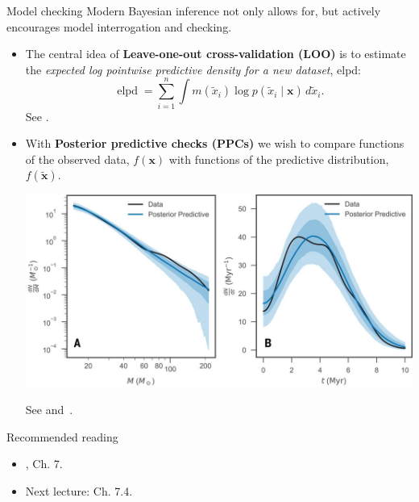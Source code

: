 \begin{frame}{Model checking}
Modern Bayesian inference not only allows for, but actively encourages model interrogation and checking.
\begin{itemize}
 \item The central idea of \textbf{Leave-one-out cross-validation (LOO)} is to estimate the \textit{expected log pointwise predictive density for a new dataset}, elpd:
 \begin{equation*}
  \operatorname{elpd} = \sum_{i=1}^n \int m(\tilde{x}_i)\log p(\tilde{x}_i \mid \boldsymbol{x})\,d\tilde{x}_i.
 \end{equation*}
 See \cite{Vehtari2017}.
 \item With \textbf{Posterior predictive checks (PPCs)} we wish to compare  functions of the observed data, $f(\boldsymbol{x})$ with functions of the predictive distribution, $f(\boldsymbol{\tilde{x}})$.
  \begin{center}
 \includegraphics[scale=0.5]{figures/PPC.jpg}
\end{center}
 See \cite{Berkhof2000} and~\cite{Gabry2019}.
\end{itemize}
\end{frame}
\begin{frame}{Recommended reading}
\begin{itemize}
  \item[\faBook] \cite{Robert2007}, Ch. 7.
 \item[\faForward] Next lecture: \cite{Schervish1995} Ch. 7.4.
 \end{itemize} 
\end{frame}
